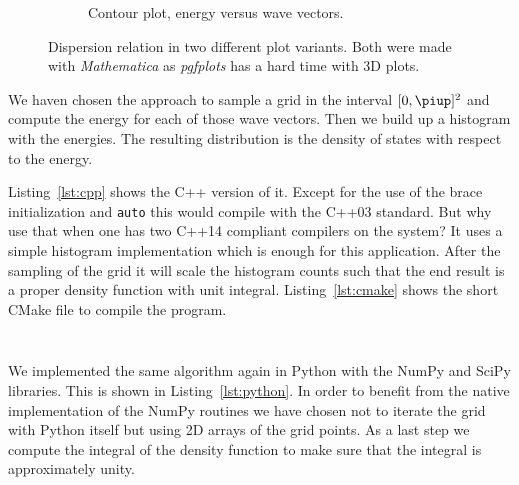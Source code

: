 \documentclass[11pt, english, fleqn, DIV=15, headinclude, BCOR=1cm]{scrartcl}
\begin{document}
\begin{figure}
\begin{subfigure}[c]{0.48\linewidth}
        \caption{%
            Contour plot, energy versus wave vectors.
        }
        \label{fig:dispersion/2}
    \end{subfigure}
    \caption{%
        Dispersion relation in two different plot variants. Both were made with
        \emph{Mathematica} as \emph{pgfplots} has a hard time with 3D plots.
    }
    \label{fig:dispersion}
\end{figure}

We haven chosen the approach to sample a grid in the interval $[0, \piup]^2$
and compute the energy for each of those wave vectors. Then we build up a
histogram with the energies. The resulting distribution is the density of
states with respect to the energy.

Listing~\ref{lst:cpp} shows the C++ version of it. Except for the use of the
brace initialization and \texttt{auto} this would compile with the C++03
standard. But why use that when one has two C++14 compliant compilers on the
system? It uses a simple histogram implementation which is enough for this
application. After the sampling of the grid it will scale the histogram counts
such that the end result is a proper density function with unit integral.
Listing~\ref{lst:cmake} shows the short CMake file to compile the program.

\begin{listing}[tb]
    \inputminted[linenos, fontsize=\footnotesize]{cpp}{dos.cpp}
    \caption{%
        C++ program for density of state computation.
    }
    \label{lst:cpp}
\end{listing}

\begin{listing}[tb]
    \inputminted[linenos, fontsize=\footnotesize]{cmake}{CMakeLists.txt}
    \caption{%
        CMake build file for C++ program.
    }
    \label{lst:cmake}
\end{listing}

We implemented the same algorithm again in Python with the NumPy and SciPy
libraries. This is shown in Listing~\ref{lst:python}. In order to benefit from
the native implementation of the NumPy routines we have chosen not to iterate
the grid with Python itself but using 2D arrays of the grid points. As a last
step we compute the integral of the density function to make sure that the
integral is approximately unity.

\begin{listing}[tb]
    \inputminted[linenos, fontsize=\footnotesize]{python}{dos.py}
    \caption{%
        Python program for density of state computation.
    }
    \label{lst:python}
\end{listing}
\end{document}
